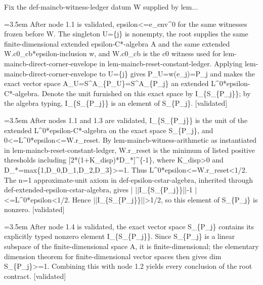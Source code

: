 \documentclass{article}
\newcommand{\step}[1]{\par\noindent\hangindent=3.5em\hangafter=1%
  \makebox[3.5em][l]{\textbf{#1.}}}
\newcommand{\steptag}[1]{\hfill{\small\textsf{[#1]}}}
\begin{document}
\begin{proofbox}{Fix the def-maincb-witness-ledger datum W supplied by lem...}
\step{1.3} After node 1.1 is validated, epsilon<=e\_env\textasciicircum{}0 for the same witnesses frozen before W. The singleton U=\{j\} is nonempty, the root supplies the same finite-dimensional extended epsilon-C*-algebra A and the same extended W.c0\_cb*epsilon-inclusion w, and W.c0\_cb is the c0 witness used for lem-maincb-direct-corner-envelope in lem-maincb-reset-constant-ledger. Applying lem-maincb-direct-corner-envelope to U=\{j\} gives P\_U=w(e\_j)=P\_j and makes the exact vector space A\_U=S\textasciicircum{}A\_\{P\_U\}=S\textasciicircum{}A\_\{P\_j\} an extended L\textasciicircum{}0*epsilon-C*-algebra. Denote the unit furnished on this exact space by I\_\{S\_\{P\_j\}\}; by the algebra typing, I\_\{S\_\{P\_j\}\} is an element of S\_\{P\_j\}. \steptag{validated} \\[4pt]
\step{1.4} After nodes 1.1 and 1.3 are validated, I\_\{S\_\{P\_j\}\} is the unit of the extended L\textasciicircum{}0*epsilon-C*-algebra on the exact space S\_\{P\_j\}, and 0<=L\textasciicircum{}0*epsilon<=W.r\_reset. By lem-maincb-witness-arithmetic as instantiated in lem-maincb-reset-constant-ledger, W.r\_reset is the minimum of listed positive thresholds including [2*(1+K\_disp)*D\_*]\textasciicircum{}\{-1\}, where K\_disp>0 and D\_*=max\{1,D\_0,D\_1,D\_2,D\_3\}>=1. Thus L\textasciicircum{}0*epsilon<=W.r\_reset<1/2. The n=1 approximate-unit axiom in def-epsilon-cstar-algebra, inherited through def-extended-epsilon-cstar-algebra, gives | ||I\_\{S\_\{P\_j\}\}||-1 |<=L\textasciicircum{}0*epsilon<1/2. Hence ||I\_\{S\_\{P\_j\}\}||>1/2, so this element of S\_\{P\_j\} is nonzero. \steptag{validated} \\[4pt]
\step{1.5} After node 1.4 is validated, the exact vector space S\_\{P\_j\} contains its explicitly typed nonzero element I\_\{S\_\{P\_j\}\}. Since S\_\{P\_j\} is a linear subspace of the finite-dimensional space A, it is finite-dimensional; the elementary dimension theorem for finite-dimensional vector spaces then gives dim S\_\{P\_j\}>=1. Combining this with node 1.2 yields every conclusion of the root contract. \steptag{validated} \\[4pt]
\end{proofbox}
\end{document}
